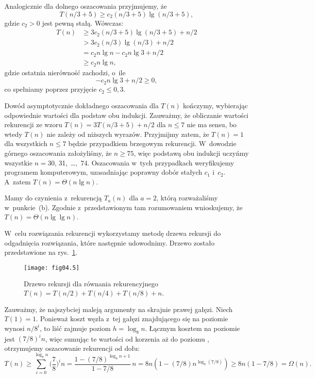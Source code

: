 Analogicznie dla dolnego oszacowania przyjmujemy, że
\[
	T(n/3+5) \ge c_2(n/3+5)\lg(n/3+5),
\]
gdzie $c_2>0$ jest pewną stałą. Wówczas:
\begin{align*}
	T(n) &\ge 3c_2(n/3+5)\lg(n/3+5)+n/2 \\
	&> 3c_2(n/3)\lg(n/3)+n/2 \\
	&= c_2n\lg n-c_2n\lg3+n/2 \\
	&\ge c_2n\lg n,
\end{align*}
gdzie ostatnia nierówność zachodzi, o~ile
\[
	-c_2n\lg3+n/2 \ge 0,
\]
co spełniamy poprzez przyjęcie $c_2\le0{,}3$.

Dowód asymptotycznie dokładnego oszacowania dla $T(n)$ kończymy, wybierając odpowiednie wartości dla podstaw obu indukcji. Zauważmy, że obliczanie wartości rekurencji ze wzoru $T(n)=3T(n/3+5)+n/2$ dla $n\le7$ nie ma sensu, bo wtedy $T(n)$ nie zależy od niższych wyrazów. Przyjmijmy zatem, że $T(n)=1$ dla wszystkich $n\le7$ będzie przypadkiem brzegowym rekurencji. W~dowodzie górnego oszacowania założyliśmy, że $n\ge75$, więc podstawą obu indukcji uczyńmy wszystkie $n=30$, 31,~\dots,~74. Oszacowania w~tych przypadkach weryfikujemy programem komputerowym, uzasadniając poprawny dobór stałych $c_1$ i~$c_2$. A~zatem $T(n)=\Theta(n\lg n)$.

\subproblem %
Mamy do czynienia z~rekurencją $T_a(n)$ dla $a=2$, którą rozważaliśmy w~punkcie~(b). Zgodnie z~przedstawionym tam rozumowaniem wnioskujemy, że $T(n)=\Theta(n\lg\lg n)$.

\subproblem %
W~celu rozwiązania rekurencji wykorzystamy metodę drzewa rekursji do odgadnięcia rozwiązania, które następnie udowodnimy. Drzewo zostało przedstawione na rys.~\ref{fig:4-4f}.
\begin{figure}[ht]
	\begin{center}
		\texttt{[image: fig04.5]}
	\end{center}
	\caption{Drzewo rekursji dla równania rekurencyjnego $T(n)=T(n/2)+T(n/4)+T(n/8)+n$.} \label{fig:4-4f}
\end{figure}

Zauważmy, że najszybciej maleją argumenty na skrajnie prawej gałęzi. Niech $T(1)=1$. Ponieważ koszt węzła z~tej gałęzi znajdującego się na  poziomie wynosi $n/8^i$, to liść zajmuje poziom $h=\log_8n$. Łącznym kosztem na  poziomie jest $(7/8)^in$, więc sumując te wartości od korzenia aż do poziomu , otrzymujemy oszacowanie rekurencji od dołu:
\[
	T(n) \ge \sum_{i=0}^{\log_8n}\biggl(\frac{7}{8}\biggr)^in = \frac{1-(7/8)^{\log_8n+1}}{1-7/8}\,n = 8n(1-(7/8)n^{\log_8(7/8)}) \ge 8n(1-7/8) = \Omega(n).
\]

